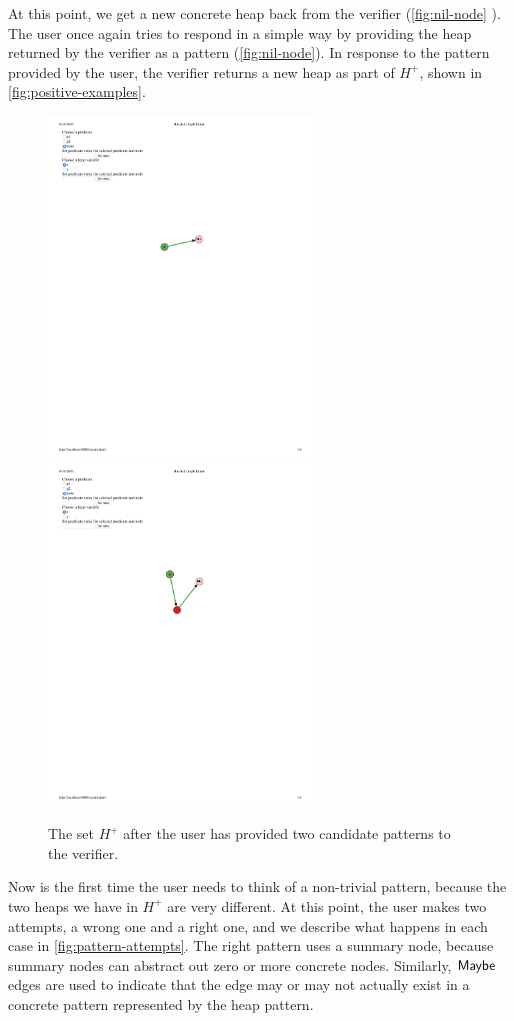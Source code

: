 At this point, we get a new concrete heap back from the verifier (\autoref{fig:nil-node}
). The user once again tries to respond in a simple way by providing the heap returned
by the verifier as a pattern (\autoref{fig:nil-node}). In response to the pattern
provided by the user, the verifier returns a new heap as part of $H^{+}$, shown in
\autoref{fig:positive-examples}.

\begin{figure}
  \centering
  \includegraphics[width=7cm]{fig/positive1.pdf}
  \includegraphics[width=7cm]{fig/positive2.pdf}
  \caption{The set $H^{+}$ after the user has provided two candidate patterns to the verifier.}
  \label{fig:positive-examples}
\end{figure}

Now is the first time the user needs to think of a non-trivial pattern, because the two
heaps we have in $H^{+}$ are very different. At this point, the user makes two attempts,
a wrong one and a right one, and we describe what happens in each case in
\autoref{fig:pattern-attempts}. The right pattern uses a summary node, because summary
nodes can abstract out zero or more concrete nodes. Similarly, $\mathsf{Maybe}$ edges are used
to indicate that the edge may or may not actually exist in a concrete pattern
represented by the heap pattern.

